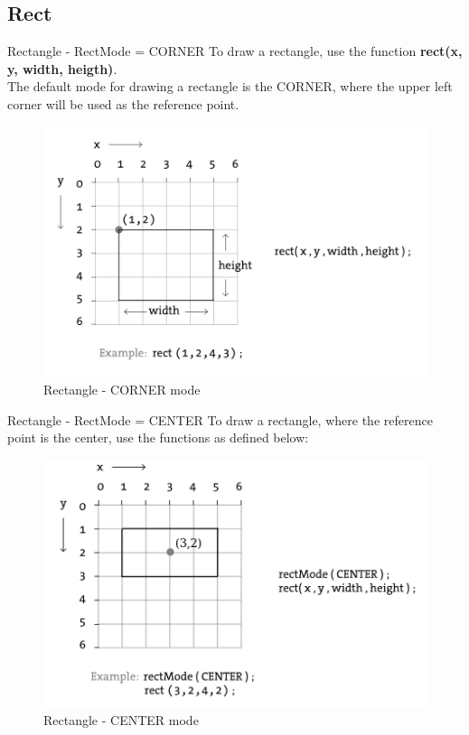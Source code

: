 \documentclass{beamer}
\begin{document}
\subsection{Rect}

\begin{frame}{Rectangle - RectMode = CORNER}
To draw a rectangle, use the function \textbf{rect(x, y, width, heigth)}.\\
The default mode for drawing a rectangle is the CORNER, where the upper
left corner will be used as the reference point.\\

\begin{figure}[H]
\centerline{\includegraphics[scale=0.5]{rectangle_corner_mode.png}}
\caption{Rectangle - CORNER mode}
\end{figure}
\end{frame}

\begin{frame}{Rectangle - RectMode = CENTER}
To draw a rectangle, where the reference point is the center, use the
functions as defined below:\\

\begin{figure}[H]
\centerline{\includegraphics[scale=0.5]{rectangle_center_mode.png}}
\caption{Rectangle - CENTER mode}
\end{figure}
\end{frame}
\end{document}
